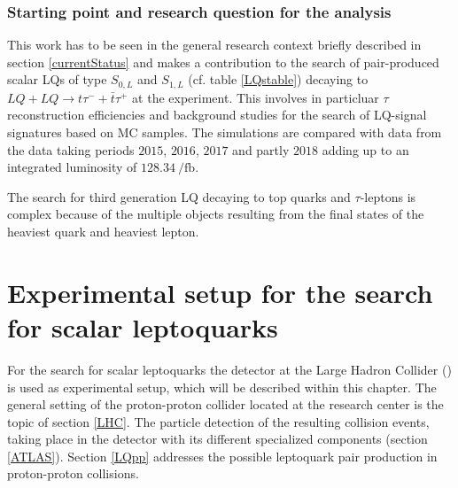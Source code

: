 \subsection{Starting point and research question for the analysis}
This work has to be seen in the general research context briefly described in section \ref{currentStatus} and makes a contribution to the search of pair-produced scalar LQs of type $S_{0,L}$ and $S_{1,L}$ (cf. table \ref{LQstable}) decaying to $LQ+LQ\rightarrow t\tau^{-}+\bar{t}\tau^{+}$ at the {\ATLAS} experiment. This involves in particluar $\tau$ reconstruction efficiencies and background studies for the search of LQ-signal signatures based on MC samples. The simulations are compared with data from the data taking periods $2015$, $2016$, $2017$ and partly $2018$ adding up to an integrated luminosity of $\SI{128.34}{\per\femto\barn}$.\par   
The search for third generation LQ decaying to top quarks and $\tau$-leptons is complex because of the multiple objects resulting from the final states of the heaviest quark and heaviest lepton. 

\chapter{Experimental setup for the search for scalar leptoquarks}\label{experiment}
For the search for scalar leptoquarks the {\ATLAS} detector at the Large Hadron Collider ({\LHC}) is used as experimental setup, which will be described within this chapter. The general setting of the proton-proton collider located at the {\CERN} research center is the topic of section \ref{LHC}. The particle detection of the resulting collision events, taking place in the {\ATLAS} detector with its different specialized components (section \ref{ATLAS}). Section \ref{LQpp} addresses the possible leptoquark pair production in proton-proton collisions.  
